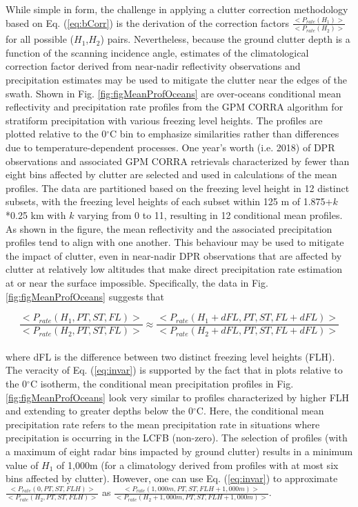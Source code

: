 \documentclass{ametsocV6.1} %
\begin{document}
While simple in form, the challenge in applying a clutter correction methodology based on Eq. (\ref{eq:bCorr}) is the derivation of the correction factors $\frac {<P_{rate}(H_1)>} {<P_{rate}(H_2)>}$ for all possible ($H_1$,$H_2$) pairs. Nevertheless, because the ground clutter depth is a function of the scanning incidence angle, estimates of the climatological correction factor derived from near-nadir reflectivity observations and precipitation estimates may be used to mitigate the clutter near the edges of the swath.  Shown in Fig. \ref{fig:figMeanProfOceans} are over-oceans conditional mean reflectivity and precipitation rate profiles from the GPM CORRA algorithm \citep{grecu2016} for stratiform precipitation with various freezing level heights. The profiles are plotted relative to the 0$^\circ$C bin to emphasize similarities rather than differences due to temperature-dependent processes. One year's worth (i.e. 2018) of DPR observations and associated GPM CORRA retrievals characterized by fewer than eight bins affected by clutter are selected and used in calculations of the mean profiles. The data are partitioned based on the freezing level height in 12 distinct subsets, with the freezing level heights of each subset within 125 m of 1.875+$k$*0.25 km with $k$ varying from 0 to 11, resulting in 12 conditional mean profiles. As shown in the figure, the mean reflectivity and the associated precipitation profiles tend to align with one another. This behaviour may be used to mitigate the impact of clutter, even in near-nadir DPR observations that are affected by clutter at relatively low altitudes that make direct precipitation rate estimation at or near the surface impossible.  Specifically, the data in Fig. \ref{fig:figMeanProfOceans} suggests that 

\begin{equation}
\frac {<P_{rate}(H_1,PT,ST,FL)>} {<P_{rate}(H_2,PT,ST,FL)>} \approx 
\frac {<P_{rate}(H_1+dFL,PT,ST,FL+dFL)>} {<P_{rate}(H_2+dFL,PT,ST,FL+dFL)>} 
\label{eq:invar}
\end{equation}\\

\noindent where dFL is the difference between two distinct freezing level heights (FLH). The veracity of Eq. (\ref{eq:invar}) is supported by the fact that in plots relative to the 0$^\circ$C isotherm, the conditional mean precipitation profiles in Fig. \ref{fig:figMeanProfOceans} look very similar to profiles characterized by higher FLH and extending to greater depths below the 0$^\circ$C. Here, the conditional mean precipitation rate refers to the mean precipitation rate in situations where precipitation is occurring in the LCFB (non-zero). The selection of profiles (with a maximum of eight radar bins impacted by ground clutter) results in a minimum value of $H_1$ of 1,000m (for a climatology derived from profiles with at most six bins affected by clutter).  However, one can use Eq. (\ref{eq:invar}) to approximate  $\frac {<P_{rate}(0,PT,ST,FLH)>} {<P_{rate}(H_2,PT,ST,FLH)>}$ as $\frac {<P_{rate}(1,000m,PT,ST,FLH+1,000m)>} {<P_{rate}(H_2+1,000m,PT,ST,FLH+1,000m)>}$.
\end{document}
